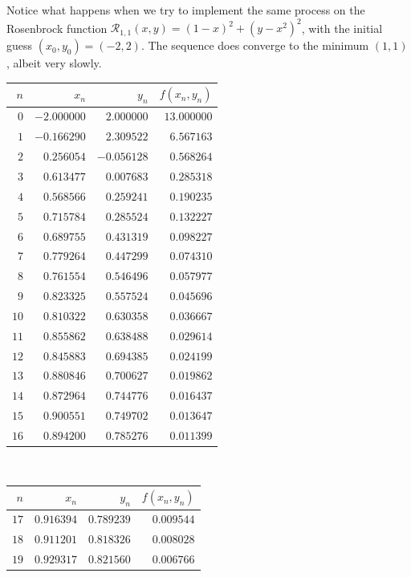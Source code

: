 \begin{example}\label{example:SDR}
Notice what happens when we try to implement the same process on the Rosenbrock function $\mathcal{R}_{1,1}(x,y) = (1-x)^2 + (y-x^2)^2$, with the initial guess $(x_0, y_0) = (-2,2)$.  The sequence does converge to the minimum $(1,1)$, albeit very slowly.
\begin{center}
\begin{tabular}{|r|r|r|r|} \hline 
 $n$ & $x_n$ & $y_n$ & $f(x_n,y_n)$ \\ \hline \hline 
$0$ & $-2.000000$ & $2.000000$ & $13.000000$ \\ \hline 
$1$ & $-0.166290$ & $2.309522$ & $6.567163$ \\ \hline 
$2$ & $0.256054$ & $-0.056128$ & $0.568264$ \\ \hline 
$3$ & $0.613477$ & $0.007683$ & $0.285318$ \\ \hline 
$4$ & $0.568566$ & $0.259241$ & $0.190235$ \\ \hline 
$5$ & $0.715784$ & $0.285524$ & $0.132227$ \\ \hline 
$6$ & $0.689755$ & $0.431319$ & $0.098227$ \\ \hline 
$7$ & $0.779264$ & $0.447299$ & $0.074310$ \\ \hline 
$8$ & $0.761554$ & $0.546496$ & $0.057977$ \\ \hline 
$9$ & $0.823325$ & $0.557524$ & $0.045696$ \\ \hline 
$10$ & $0.810322$ & $0.630358$ & $0.036667$ \\ \hline 
$11$ & $0.855862$ & $0.638488$ & $0.029614$ \\ \hline 
$12$ & $0.845883$ & $0.694385$ & $0.024199$ \\ \hline 
$13$ & $0.880846$ & $0.700627$ & $0.019862$ \\ \hline 
$14$ & $0.872964$ & $0.744776$ & $0.016437$ \\ \hline 
$15$ & $0.900551$ & $0.749702$ & $0.013647$ \\ \hline 
$16$ & $0.894200$ & $0.785276$ & $0.011399$ \\ \hline 
\end{tabular}~\begin{tabular}{|r|r|r|r|} \hline
 $n$ & $x_n$ & $y_n$ & $f(x_n,y_n)$ \\ \hline \hline 
$17$ & $0.916394$ & $0.789239$ & $0.009544$ \\ \hline 
$18$ & $0.911201$ & $0.818326$ & $0.008028$ \\ \hline 
$19$ & $0.929317$ & $0.821560$ & $0.006766$ \\ \hline 

\end{tabular}
\end{center}
\end{example}
